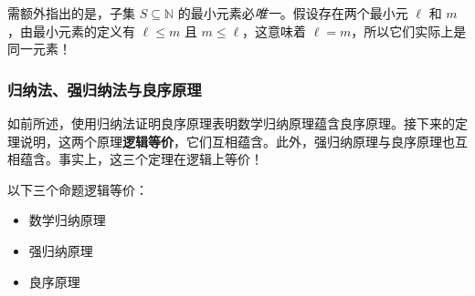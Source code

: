 需额外指出的是，子集 $S \subseteq \mathbb{N}$ 的最小元素必\emph{唯一}。假设存在两个最小元 $\ell$ 和 $m$，由最小元素的定义有 $\ell \le m$ 且 $m \le \ell$，这意味着 $\ell = m$，所以它们实际上是同一元素！

\subsubsection*{归纳法、强归纳法与良序原理}

如前所述，使用归纳法证明良序原理表明数学归纳原理蕴含良序原理。接下来的定理说明，这两个原理\textbf{逻辑等价}，它们互相蕴含。此外，强归纳原理与良序原理也互相蕴含。事实上，这三个定理在逻辑上等价！

\begin{theorem}
    以下三个命题逻辑等价：
    \begin{itemize}
        \item 数学归纳原理
        \item 强归纳原理
        \item 良序原理
    \end{itemize}
\end{theorem}

